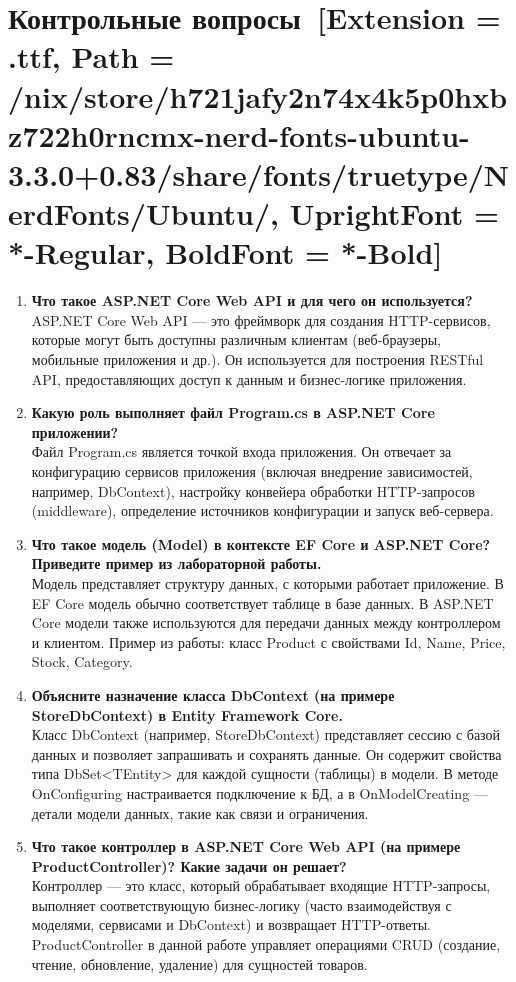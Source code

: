 \documentclass[12pt]{article}
\newcommand{\icon}[1]{\fontspec{UbuntuNerdFont}[Extension = .ttf,
  Path = /nix/store/h721jafy2n74x4k5p0hxbz722h0rncmx-nerd-fonts-ubuntu-3.3.0+0.83/share/fonts/truetype/NerdFonts/Ubuntu/,
  UprightFont = *-Regular,
BoldFont = *-Bold] #1}
\newcommand{\iicon}[1]{{\icon{#1}}}
\renewcommand{\texttt}[1]{{\small\ttfamily #1}}
\numberwithin{listing}{section}
\numberwithin{figure}{section}
\begin{document}
\pagebreak

\section{Контрольные вопросы~\texorpdfstring{\iicon{}}{}}
\begin{enumerate}
	\item \textbf{Что такое ASP.NET Core Web API и для чего он используется?} \\
	      ASP.NET Core Web API — это фреймворк для создания HTTP-сервисов, которые могут быть доступны различным клиентам (веб-браузеры, мобильные приложения и др.). Он используется для построения RESTful API, предоставляющих доступ к данным и бизнес-логике приложения.

	\item \textbf{Какую роль выполняет файл \texttt{Program.cs} в ASP.NET Core приложении?} \\
	      Файл \texttt{Program.cs} является точкой входа приложения. Он отвечает за конфигурацию сервисов приложения (включая внедрение зависимостей, например, \texttt{DbContext}), настройку конвейера обработки HTTP-запросов (middleware), определение источников конфигурации и запуск веб-сервера.

	\item \textbf{Что такое модель (Model) в контексте EF Core и ASP.NET Core? Приведите пример из лабораторной работы.} \\
	      Модель представляет структуру данных, с которыми работает приложение. В EF Core модель обычно соответствует таблице в базе данных. В ASP.NET Core модели также используются для передачи данных между контроллером и клиентом. Пример из работы: класс \texttt{Product} с свойствами \texttt{Id}, \texttt{Name}, \texttt{Price}, \texttt{Stock}, \texttt{Category}.

	\item \textbf{Объясните назначение класса \texttt{DbContext} (на примере \texttt{StoreDbContext}) в Entity Framework Core.} \\
	      Класс \texttt{DbContext} (например, \texttt{StoreDbContext}) представляет сессию с базой данных и позволяет запрашивать и сохранять данные. Он содержит свойства типа \texttt{DbSet<TEntity>} для каждой сущности (таблицы) в модели. В методе \texttt{OnConfiguring} настраивается подключение к БД, а в \texttt{OnModelCreating} — детали модели данных, такие как связи и ограничения.

	\item \textbf{Что такое контроллер в ASP.NET Core Web API (на примере \texttt{ProductController})? Какие задачи он решает?} \\
	      Контроллер — это класс, который обрабатывает входящие HTTP-запросы, выполняет соответствующую бизнес-логику (часто взаимодействуя с моделями, сервисами и \texttt{DbContext}) и возвращает HTTP-ответы. \texttt{ProductController} в данной работе управляет операциями CRUD (создание, чтение, обновление, удаление) для сущностей товаров.


\end{enumerate}
\end{document}
